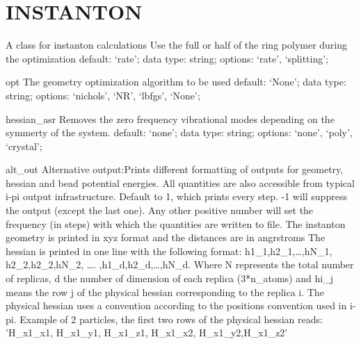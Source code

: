 \section{INSTANTON}
\label{INSTANTON}
\begin{ipifield}{}%
{A class for instanton calculations}%
{}%
{%
{Use the full or half of the ring polymer during the optimization}%
{default: `rate'; data type: string; options: `rate', `splitting'; }%
}
\begin{ipifield}{opt}%
{The geometry optimization algorithm to be used}%
{default: `None'; data type: string; options: `nichols', `NR', `lbfgs', `None'; }%
{}
\end{ipifield}
\begin{ipifield}{hessian\_asr}%
{Removes the zero frequency vibrational modes depending on the symmerty of the system.}%
{default: `none'; data type: string; options: `none', `poly', `crystal'; }%
{}
\end{ipifield}
\begin{ipifield}{alt\_out}%
{Alternative output:Prints different formatting of outputs for geometry, hessian and bead potential energies.
                                               All quantities are also accessible from typical i-pi output infrastructure. 
                                               Default to 1, which prints every step. -1 will suppress the output (except the last one). 
                                               Any other positive number will set the frequency (in steps) with which the quantities are 
                                               written to file.
                                               The instanton geometry is printed in xyz format and the distances are in angrstroms
                                               The hessian is printed in one line with the following format:
                                               h1\_1,h2\_1,\ldots ,hN\_1,   h2\_2,h2\_2,hN\_2,   \ldots .   ,h1\_d,h2\_d,\ldots ,hN\_d.
                                               Where N represents the total number of replicas, d the number of dimension of each replica (3*n\_atoms) and
                                               hi\_j means the row j of the physical hessian corresponding to the replica i. 
                                               The physical hessian uses a convention according to the positions convention used in  i-pi. 
                                               Example of 2 particles, the first two rows of the physical hessian reads:
                                               'H\_x1\_x1, H\_x1\_y1, H\_x1\_z1, H\_x1\_x2, H\_x1\_y2,H\_x1\_z2'
}
\end{ipifield}
\end{ipifield}
